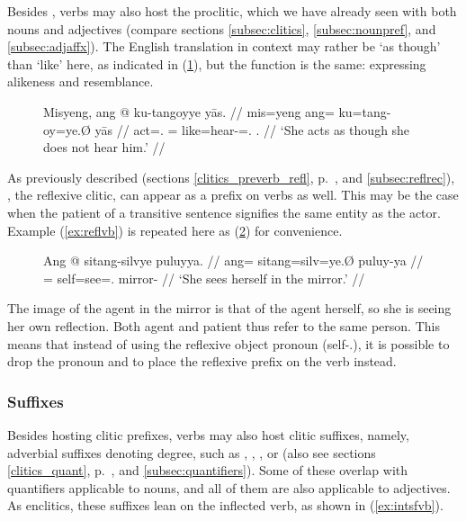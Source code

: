 Besides , verbs may also host the 
proclitic, which we have already seen with both nouns and adjectives (compare
sections \ref{subsec:clitics}, \ref{subsec:nounpref}, and
\ref{subsec:adjaffx}). The English translation in context may rather be `as
though' than `like' here, as indicated in (\ref{ex:likecompl}), but the
function is the same: expressing alikeness and resemblance.

\begin{figure}[h]
\ex\label{ex:likecompl}\begingl
	\gla Misyeng, ang @ ku-tangoyye yās. //
	\glb mis=yeng ang= ku=tang-oy=ye.Ø yās //
	\glc act=\TsgF{}.\Aarg{} \AgtT{}= like=hear-\Neg{}=\TsgF{}.\Top{} 
		\TsgM{}.\Parg{} //
	\glft `She acts as though she does not hear him.' //
\endgl\xe
\end{figure}

As previously described (sections \ref{clitics_preverb_refl},
p.~\pageref{clitics_preverb_refl}, and \ref{subsec:reflrec}),
, the reflexive clitic, can appear as a prefix on
verbs as well. This may be the case when the patient of a transitive sentence
signifies the same entity as the actor. Example (\ref{ex:reflvb}) is repeated
here as (\ref{ex:reflvb_2}) for convenience.

\begin{figure}[h]
\ex\label{ex:reflvb_2}\begingl
	\gla Ang @ sitang-silvye puluyya. //
	\glb ang= sitang=silv=ye.Ø puluy-ya //
	\glc \AgtT{}= self=see=\TsgF{}.\Top{} mirror-\Loc{} //
	\glft `She sees herself in the mirror.' //
\endgl\xe
\end{figure}

The image of the agent in the mirror is that of the agent herself, so she is
seeing her own reflection. Both agent and patient thus refer to the same
person. This means that instead of using the reflexive object pronoun
 (self-\TsgF{}.\Parg{}), it is possible
to drop the pronoun and to place the reflexive prefix on the verb instead.

\subsubsection{Suffixes}

Besides hosting clitic prefixes, verbs may also host clitic suffixes, namely,
adverbial suffixes denoting degree, such as
,
,
, or
(also see sections \ref{clitics_quant}, p.~\pageref{clitics_quant}, and
\ref{subsec:quantifiers}). Some of these overlap with quantifiers
applicable to nouns, and all of them are also applicable to adjectives. As
enclitics, these suffixes lean on the inflected verb, as shown in 
(\ref{ex:intsfvb}).

